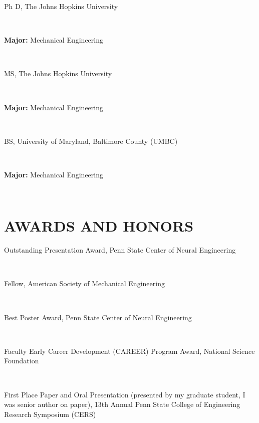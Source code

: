 \documentclass[a4paper,10pt]{article}
\begin{document}
            \noindent \parbox[t]{0.8\linewidth}{\raggedright Ph D, The Johns Hopkins University} \hfill \parbox[t]{0.2\linewidth}{} \\
            \noindent \parbox[t]{0.8\linewidth}{\raggedright \textbf{Major:} Mechanical Engineering} \\
            
            \noindent \parbox[t]{0.8\linewidth}{\raggedright MS, The Johns Hopkins University} \hfill \parbox[t]{0.2\linewidth}{} \\
            \noindent \parbox[t]{0.8\linewidth}{\raggedright \textbf{Major:} Mechanical Engineering} \\
            
            \noindent \parbox[t]{0.8\linewidth}{\raggedright BS, University of Maryland,  Baltimore County (UMBC)} \hfill \parbox[t]{0.2\linewidth}{} \\
            \noindent \parbox[t]{0.8\linewidth}{\raggedright \textbf{Major:} Mechanical Engineering} \\
            

    \section*{AWARDS AND HONORS}
    
        \noindent \parbox[t]{0.8\linewidth}{\raggedright Outstanding Presentation Award, Penn State Center of Neural Engineering} \hfill \parbox[t]{0.2\linewidth}{} \\
        
        \noindent \parbox[t]{0.8\linewidth}{\raggedright Fellow, American Society of Mechanical Engineering} \hfill \parbox[t]{0.2\linewidth}{} \\
        
        \noindent \parbox[t]{0.8\linewidth}{\raggedright Best Poster Award, Penn State Center of Neural Engineering} \hfill \parbox[t]{0.2\linewidth}{} \\
        
        \noindent \parbox[t]{0.8\linewidth}{\raggedright Faculty Early Career Development (CAREER) Program Award, National Science Foundation} \hfill \parbox[t]{0.2\linewidth}{} \\
        
        \noindent \parbox[t]{0.8\linewidth}{\raggedright First Place Paper and Oral Presentation (presented by my graduate student, I was senior author on paper), 13th Annual Penn State College of Engineering Research Symposium (CERS)} \hfill \parbox[t]{0.2\linewidth}{} \\
        
\end{document}
